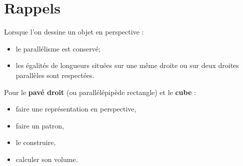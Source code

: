 \section{Rappels}
    \begin{propriete}
        Lorsque l'on dessine un objet en perspective :
        \begin{itemize}
            \item le parallélisme est conservé;
            \item les égalités de longueurs situées sur une même droite ou sur deux droites parallèles sont respectées.
        \end{itemize}
    \end{propriete}
    {\renewcommand{\StringDEFINITION}{Tu dois savoir}
        \begin{definition}
            Pour le \textbf{pavé droit} (ou parallélépipède rectangle) et le \textbf{cube} :
            \begin{itemize}
                \item faire une représentation en perspective,
                \item faire un patron,
                \item le construire,
                \item calculer son volume.
            \end{itemize}
        \end{definition}
    }
